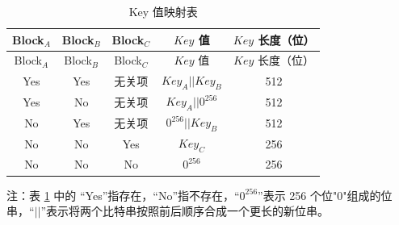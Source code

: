 \documentclass[main\_\_CN.tex]{subfiles}
\begin{document}
\begin{longtable}[c]{ |c|c|c|c|c| }
\caption{ Key 值映射表}
\label{table:ExternalMemoryEncryptionDecryptionKeyPossibility}
\\\hline
\rowcolor{lightgray}
Block$_A$   &   Block$_B$   &   Block$_C$   &   \begin{math}Key\end{math} 值        &   \begin{math}Key\end{math} 长度（位）
\\\hline
\endfirsthead
\hline
\rowcolor{lightgray}
Block$_A$   &   Block$_B$   &   Block$_C$   &   \begin{math}Key\end{math} 值        &   \begin{math}Key\end{math} 长度（位）
\\\hline
\endhead
\endfoot
Yes         &   Yes         &   无关项        &   \begin{math}Key_{A} || Key_{B}\end{math}    &   512   \\\hline
Yes         &   No          &   无关项          &   \begin{math}Key_{A} || 0^{256}\end{math}    &   512   \\\hline
No          &   Yes         &  无关项          &   \begin{math}0^{256} || Key_{B}\end{math}    &   512   \\\hline
No          &   No          &   Yes         &   \begin{math}           Key_{C}\end{math}    &   256   \\\hline
No          &   No          &   No          &   \begin{math}           0^{256}\end{math}    &   256   \\\hline
\end{longtable}
注：表 \ref{table:ExternalMemoryEncryptionDecryptionKeyPossibility} 中的 “Yes”指存在，“No”指不存在，“\begin{math}0^{256}\end{math}”表示 256 个位"0"组成的位串，“\begin{math}||\end{math}”表示将两个比特串按照前后顺序合成一个更长的新位串。
\end{document}
